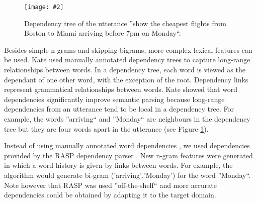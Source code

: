 \documentclass{article}
\newcommand{\citep}[1]{\cite{#1}}
\newcommand{\fgrparam}[4]{
  \begin{figure}[htbp]
    \begin{center}
      \leavevmode
      \texttt{[image: \#2]}
    \end{center}
    \vspace{-0.5cm}
    \caption{#4}
    \label{#3}
  \end{figure}
}
\begin{document}
\fgrparam{width=6cm}{./fig/dep-tree.pdf}{fig:dep:tree}{Dependency tree of the utterance ''show the cheapest flights from Boston to Miami arriving before 7pm on Monday``.}

Besides simple n-grams and skipping bigrams, more complex lexical features can be used. Kate \citep{kate08} used manually annotated dependency trees to capture long-range relationships between words. In a dependency tree, each word is viewed as the dependant of one other word, with the exception of the root. Dependency links represent grammatical relationships between words.
Kate showed that word dependencies significantly improve semantic parsing because long-range dependencies from an utterance tend to be local in a dependency tree. For example, the words ''arriving`` and ''Monday`` are neighbours in the dependency tree but they are four words apart in the utterance (see Figure \ref{fig:dep:tree}).

Instead of using manually annotated word dependencies \cite{kate08}, we used dependencies provided by the RASP dependency parser \cite{rasp06}. 
New n-gram features were generated in which a word history is given by links between words. For example, the algorithm would generate bi-gram ('arriving','Monday') for the word ''Monday``.
Note however that RASP was used ''off-the-shelf`` and more accurate dependencies could be obtained by adapting it to the target domain.
\end{document}

